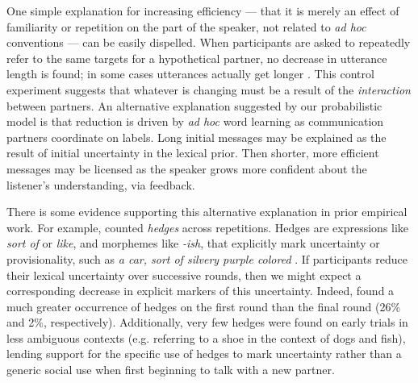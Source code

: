 

One simple explanation for increasing efficiency --- that it is merely an effect of familiarity or repetition on the part of the speaker, not related to \emph{ad hoc} conventions --- can be easily dispelled. 
When participants are asked to repeatedly refer to the same targets for a hypothetical partner, no decrease in utterance length is found; in some cases utterances actually get longer \cite{HupetChantraine92_CollaborationOrRepitition}. 
This control experiment suggests that whatever is changing must be a result of the \emph{interaction} between partners.
An alternative explanation suggested by our probabilistic model is that reduction is driven by \emph{ad hoc} word learning as communication partners coordinate on labels. 
Long initial messages may be explained as the result of initial uncertainty in the lexical prior.
Then shorter, more efficient messages may be licensed as the speaker grows more confident about the listener's understanding, via feedback.

There is some evidence supporting this alternative explanation in prior empirical work.
For example,  counted \emph{hedges} across repetitions.
Hedges are expressions like \emph{sort of} or \emph{like}, and morphemes like \emph{-ish}, that explicitly mark uncertainty or provisionality, such as \emph{a car, sort of silvery purple colored} \cite{BrennanClark96_ConceptualPactsConversation,Fraser10_Hedging,MedlockBriscoe07_HedgeClassification}.
If participants reduce their lexical uncertainty over successive rounds, then we might expect a corresponding decrease in explicit markers of this uncertainty. 
Indeed,  found a much greater occurrence of hedges on the first round than the final round (26\% and 2\%, respectively).
Additionally, very few hedges were found on early trials in less ambiguous contexts (e.g. referring to a shoe in the context of dogs and fish), lending support for the specific use of hedges to mark uncertainty rather than a generic social use when first beginning to talk with a new partner.

